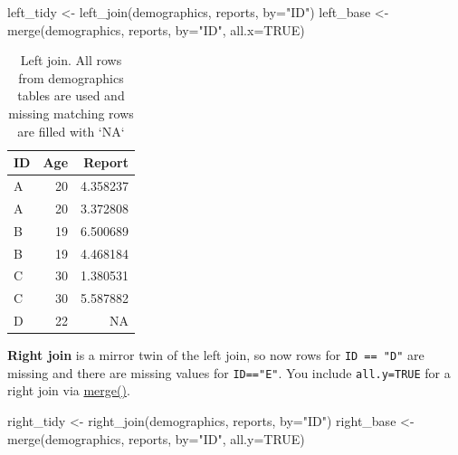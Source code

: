 \documentclass[
]{book}
\newenvironment{Shaded}{\begin{snugshade}}{\end{snugshade}}
\newcommand{\AttributeTok}[1]{\textcolor[rgb]{0.77,0.63,0.00}{#1}}
\newcommand{\ConstantTok}[1]{\textcolor[rgb]{0.00,0.00,0.00}{#1}}
\newcommand{\FunctionTok}[1]{\textcolor[rgb]{0.00,0.00,0.00}{#1}}
\newcommand{\NormalTok}[1]{#1}
\newcommand{\OtherTok}[1]{\textcolor[rgb]{0.56,0.35,0.01}{#1}}
\newcommand{\StringTok}[1]{\textcolor[rgb]{0.31,0.60,0.02}{#1}}
\begin{document}
\begin{Shaded}
\begin{Highlighting}[]
\NormalTok{left\_tidy }\OtherTok{\textless{}{-}} \FunctionTok{left\_join}\NormalTok{(demographics, reports, }\AttributeTok{by=}\StringTok{"ID"}\NormalTok{)}
\NormalTok{left\_base }\OtherTok{\textless{}{-}} \FunctionTok{merge}\NormalTok{(demographics, reports, }\AttributeTok{by=}\StringTok{"ID"}\NormalTok{, }\AttributeTok{all.x=}\ConstantTok{TRUE}\NormalTok{)}
\end{Highlighting}
\end{Shaded}

\begin{table}

\caption{\label{tab:unnamed-chunk-185}Left join. All rows from demographics tables are used and missing matching rows are filled with `NA`}
\centering
\begin{tabular}[t]{l|r|r}
\hline
ID & Age & Report\\
\hline
A & 20 & 4.358237\\
\hline
A & 20 & 3.372808\\
\hline
B & 19 & 6.500689\\
\hline
B & 19 & 4.468184\\
\hline
C & 30 & 1.380531\\
\hline
C & 30 & 5.587882\\
\hline
D & 22 & NA\\
\hline
\end{tabular}
\end{table}

\textbf{Right join} is a mirror twin of the left join, so now rows for \texttt{ID\ ==\ "D"} are missing and there are missing values for \texttt{ID=="E"}. You include \texttt{all.y=TRUE} for a right join via \href{https://stat.ethz.ch/R-manual/R-devel/library/base/html/merge.html}{merge()}.

\begin{Shaded}
\begin{Highlighting}[]
\NormalTok{right\_tidy }\OtherTok{\textless{}{-}} \FunctionTok{right\_join}\NormalTok{(demographics, reports, }\AttributeTok{by=}\StringTok{"ID"}\NormalTok{) }
\NormalTok{right\_base }\OtherTok{\textless{}{-}} \FunctionTok{merge}\NormalTok{(demographics, reports, }\AttributeTok{by=}\StringTok{"ID"}\NormalTok{, }\AttributeTok{all.y=}\ConstantTok{TRUE}\NormalTok{)}
\end{Highlighting}
\end{Shaded}
\end{document}
